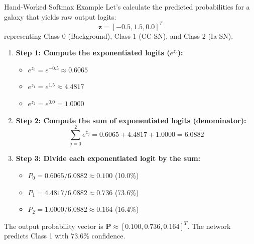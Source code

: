 \documentclass[9pt]{beamer}
\begin{document}
\begin{frame}{Hand-Worked Softmax Example}
  Let's calculate the predicted probabilities for a galaxy that yields raw output logits:
  $$\mathbf{z} = [-0.5, 1.5, 0.0]^T$$
  representing Class 0 (Background), Class 1 (CC-SN), and Class 2 (Ia-SN).
  \begin{enumerate}
    \item \textbf{Step 1: Compute the exponentiated logits ($e^{z_c}$):}
      \begin{itemize}
        \item $e^{z_0} = e^{-0.5} \approx 0.6065$
        \item $e^{z_1} = e^{1.5} \approx 4.4817$
        \item $e^{z_2} = e^{0.0} = 1.0000$
      \end{itemize}
    \item \textbf{Step 2: Compute the sum of exponentiated logits (denominator):}
      $$\sum_{j=0}^{2} e^{z_j} = 0.6065 + 4.4817 + 1.0000 = 6.0882$$
    \item \textbf{Step 3: Divide each exponentiated logit by the sum:}
      \begin{itemize}
        \item $P_0 = 0.6065 / 6.0882 \approx \mathbf{0.100}$ (10.0\%)
        \item $P_1 = 4.4817 / 6.0882 \approx \mathbf{0.736}$ (73.6\%)
        \item $P_2 = 1.0000 / 6.0882 \approx \mathbf{0.164}$ (16.4\%)
      \end{itemize}
  \end{enumerate}
  The output probability vector is $\mathbf{P} \approx [0.100, 0.736, 0.164]^T$. The network predicts Class 1 with $73.6\%$ confidence.
\end{frame}
\end{document}
